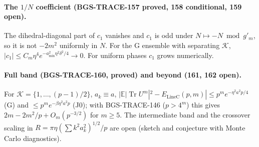 \paragraph{The \(1/N\) coefficient (BGS-TRACE-157 proved, 158 conditional, 159 open).} The dihedral-diagonal part of \(c_1\)
vanishes and \(c_1\) is odd under \(N\mapsto-N\bmod g'_m\), so it is not \(-2m^2\) uniformly in \(N\). For the G ensemble with
separating \(\mathcal K\), \(|c_1|\le C_m\eta^4e^{-a_{\min}^2\eta^2\delta^2/4}\to0\). For uniform phases \(c_1\) grows numerically.

\paragraph{Full band (BGS-TRACE-160, proved) and beyond (161, 162 open).} For \(\mathcal K=\{1,\dots,(p-1)/2\}\), \(a_k\equiv a\),
\(|\mathbb E|\operatorname{Tr}U^m|^2-E_{\mathrm{LineC}}(p,m)|\le p^me^{-\eta^2a^2p/4}\) (G) and \(\le p^me^{-\beta\eta^2a^2p}\) (J0); with
BGS-TRACE-146 (\(p>4^m\)) this gives \(2m-2m^2/p+O_m(p^{-3/2})\) for \(m\ge5\). The intermediate band and the crossover
scaling in \(R=\pi\eta(\sum k^2a_k^2)^{1/2}/p\) are open (sketch and conjecture with Monte Carlo diagnostics).
